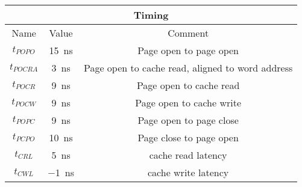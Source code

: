 \begin{table}[h]
{\begin{tabular}{|c|c|c|}
      \multicolumn{3}{|c|}{{\cellcolor{gray!25}}Timing}                                                                                               \\\hline
      {\cellcolor{gray!25}}Name       &   {\cellcolor{gray!25}}Value                  & {\cellcolor{gray!25}}Comment                                  \\\hline
      $t_{POPO}$                      &   \SI[per-mode=symbol]{15}{\nano\second}      & Page open to page open                                        \\\hline
      $t_{POCRA}$                     &   \SI[per-mode=symbol]{ 3}{\nano\second}      & Page open to cache read, aligned to word address              \\\cline{1-3}
      $t_{POCR}$                      &   \SI[per-mode=symbol]{ 9}{\nano\second}      & Page open to cache read                                       \\\cline{1-3}
      $t_{POCW}$                      &   \SI[per-mode=symbol]{ 9}{\nano\second}      & Page open to cache write                                      \\\cline{1-3}
      $t_{POPC}$                      &   \SI[per-mode=symbol]{ 9}{\nano\second}      & Page open to page close                                       \\\cline{1-3}
      $t_{PCPO}$                      &   \SI[per-mode=symbol]{10}{\nano\second}      & Page close to page open                                       \\\cline{1-3}
      $t_{CRL} $                      &   \SI[per-mode=symbol]{ 5}{\nano\second}      & cache read latency                                            \\\cline{1-3}
      $t_{CWL} $                      &   \SI[per-mode=symbol]{-1}{\nano\second}      & cache write latency                                           \\\cline{1-3}
    \end{tabular}
    }
  \captionsetup{justification=centering, skip=9pt}
  \vspace{0.0cm}
  \label{tab:DiRAM4 characteristics}
\end{table}

